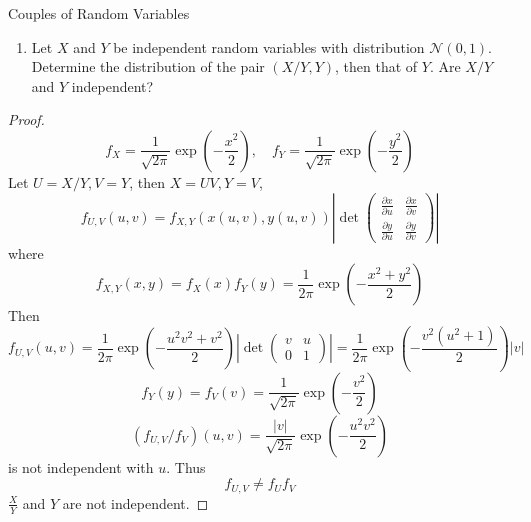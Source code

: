 \documentclass[../main.tex]{subfiles}
\begin{document}
\begin{exercise}{Couples of Random Variables}{}
    \begin{enumerate}
\item Let $X$ and $Y$ be independent random variables with distribution $\mathcal{N}(0, 1)$. Determine the distribution of the pair $(X/Y, Y)$, then that of $Y$. Are $X/Y$ and $Y$ independent?
\end{enumerate}
\end{exercise}
\begin{proof}
    \[
    f_{X}= \frac{1 }{\sqrt{2 \pi} } \exp \left( - \frac{x^{2} }{2 }  \right),\quad f_{Y}= \frac{1 }{\sqrt{2 \pi} }\exp \left( -\frac{y^{2} }{2 }  \right)    
    \] Let \(  U = X/Y, V= Y  \), then \(  X = UV, Y = V  \), \[
    f_{U,V}\left( u,v \right)= f_{X,Y}\left( x\left( u,v \right),y\left( u,v \right)   \right) \left|  \det \begin{pmatrix} 
        \frac{\partial x}{\partial u}& \frac{\partial x}{\partial v}\\ 
         \frac{\partial y}{\partial u}&\frac{\partial y}{\partial v} 
    \end{pmatrix}  \right| 
    \]  where  \[
    f_{X,Y}\left( x,y \right)= f_{X}\left( x \right)f_{Y}\left( y \right)= \frac{1 }{2 \pi } \exp \left( -\frac{x^{2}+ y^{2} }{2 }  \right)     
    \] Then \[
    f_{U,V}\left( u,v \right)= \frac{1 }{2 \pi }\exp \left( -\frac{u^{2}v^{2}+ v^{2} }{2 }  \right)\left| \det \begin{pmatrix} 
        v&u\\ 
         0&1 
    \end{pmatrix}  \right|    =  \frac{1 }{2 \pi }\exp \left( -\frac{v^{2}\left( u^{2}+ 1 \right)  }{2 }  \right)\left| v \right|   
    \] \[
    f_{Y}\left( y \right)= f_{V}\left( v \right)= \frac{1 }{\sqrt{2 \pi} }\exp \left( -\frac{v^{2} }{2 }  \right)    
    \] \[
 \left(    f_{U,V}/ f_{V} \right) \left( u,v \right) = \frac{\left| v \right|  }{\sqrt{2 \pi} } \exp \left(-\frac{u^{2}v^{2} }{2 }   \right)  
    \] is not independent with \(  u  \). Thus \[
    f_{U,V}\neq f_{U}f_{V}
    \] \(  \frac{X}{Y}  \) and \(  Y  \) are not independent.  
\end{proof}
\end{document}
